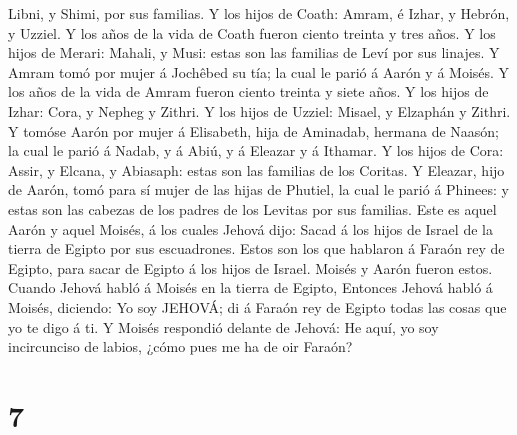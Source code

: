 Libni, y Shimi, por sus familias.  Y los hijos de Coath:
Amram, é Izhar, y Hebrón, y Uzziel. Y los años de la vida de Coath
fueron ciento treinta y tres años.  Y los hijos de Merari:
Mahali, y Musi: estas son las familias de Leví por sus linajes.
 Y Amram tomó por mujer á Jochêbed su tía; la cual le parió
á Aarón y á Moisés. Y los años de la vida de Amram fueron ciento treinta
y siete años.  Y los hijos de Izhar: Cora, y Nepheg y
Zithri.  Y los hijos de Uzziel: Misael, y Elzaphán y
Zithri.  Y tomóse Aarón por mujer á Elisabeth, hija de
Aminadab, hermana de Naasón; la cual le parió á Nadab, y á Abiú, y á
Eleazar y á Ithamar.  Y los hijos de Cora: Assir, y Elcana,
y Abiasaph: estas son las familias de los Coritas.  Y
Eleazar, hijo de Aarón, tomó para sí mujer de las hijas de Phutiel, la
cual le parió á Phinees: y estas son las cabezas de los padres de los
Levitas por sus familias.  Este es aquel Aarón y aquel
Moisés, á los cuales Jehová dijo: Sacad á los hijos de Israel de la
tierra de Egipto por sus escuadrones.  Estos son los que
hablaron á Faraón rey de Egipto, para sacar de Egipto á los hijos de
Israel. Moisés y Aarón fueron estos.  Cuando Jehová habló á
Moisés en la tierra de Egipto,  Entonces Jehová habló á
Moisés, diciendo: Yo soy JEHOVÁ; di á Faraón rey de Egipto todas las
cosas que yo te digo á ti.  Y Moisés respondió delante de
Jehová: He aquí, yo soy incircunciso de labios, ¿cómo pues me ha de oir
Faraón?

\hypertarget{section-6}{%
\section{7}\label{section-6}}

